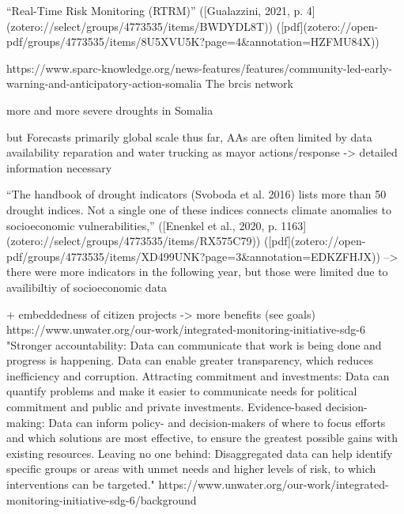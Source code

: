 {%
“Real-Time Risk Monitoring (RTRM)” ([Gualazzini, 2021, p. 4](zotero://select/groups/4773535/items/BWDYDL8T)) ([pdf](zotero://open-pdf/groups/4773535/items/8U5XVU5K?page=4&annotation=HZFMU84X))} %

https://www.sparc-knowledge.org/news-features/features/community-led-early-warning-and-anticipatory-action-somalia
The \acrshort*{brcis} network 






more and more severe droughts in Somalia

but Forecasts primarily global scale
thus far, AAs are often limited by data availability
reparation and water trucking as mayor actions/response -> detailed information necessary

“The handbook of drought indicators (Svoboda et al. 2016) lists more than 50 drought indices. Not a single one of these indices connects climate anomalies to socioeconomic vulnerabilities,” ([Enenkel et al., 2020, p. 1163](zotero://select/groups/4773535/items/RX575C79)) ([pdf](zotero://open-pdf/groups/4773535/items/XD499UNK?page=3&annotation=EDKZFHJX))
--> there were more indicators in the following year, but those were limited due to availibiltiy of socioeconomic data

+ embeddedness of citizen projects -> more benefits (see goals)
https://www.unwater.org/our-work/integrated-monitoring-initiative-sdg-6
"Stronger accountability: Data can communicate that work is being done and progress is happening. Data can enable greater transparency, which reduces inefficiency and corruption.
Attracting commitment and investments: Data can quantify problems and make it easier to communicate needs for political commitment and public and private investments.
Evidence-based decision-making: Data can inform policy- and decision-makers of where to focus efforts and which solutions are most effective, to ensure the greatest possible gains with existing resources.
Leaving no one behind: Disaggregated data can help identify specific groups or areas with unmet needs and higher levels of risk, to which interventions can be targeted."
https://www.unwater.org/our-work/integrated-monitoring-initiative-sdg-6/background

